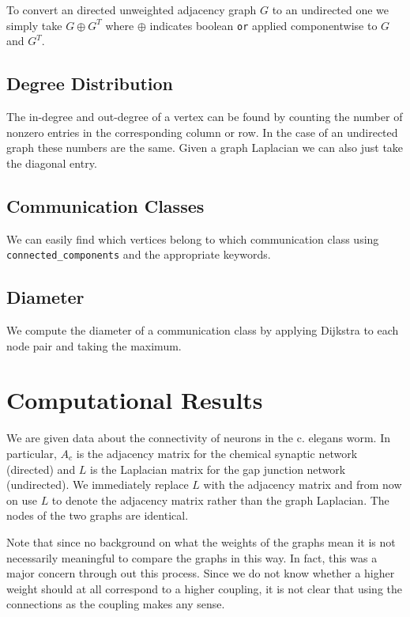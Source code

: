 \documentclass[10pt]{article}
\begin{document}
To convert an directed unweighted adjacency graph \( G \) to an undirected one we simply take \( G \oplus G^T \) where \( \oplus \) indicates boolean {\tt or} applied componentwise to \( G \) and \( G^T \).

\subsection{Degree Distribution}
The in-degree and out-degree of a vertex can be found by counting the number of nonzero entries in the corresponding column or row. In the case of an undirected graph these numbers are the same. Given a graph Laplacian we can also just take the diagonal entry.

\subsection{Communication Classes}
We can easily find which vertices belong to which communication class using {\tt connected\_components} and the appropriate keywords.

\subsection{Diameter}
We compute the diameter of a communication class by applying Dijkstra to each node pair and taking the maximum.


\section{Computational Results}

We are given data about the connectivity of neurons in the c. elegans worm. In particular, \( A_c \) is the adjacency matrix for the chemical synaptic network (directed) and \( L \) is the Laplacian matrix for the gap junction network (undirected). We immediately replace \( L \) with the adjacency matrix and from now on use \( L \) to denote the adjacency matrix rather than the graph Laplacian. The nodes of the two graphs are identical.

Note that since no background on what the weights of the graphs mean it is not necessarily meaningful to compare the graphs in this way. In fact, this was a major concern through out this process. Since we do not know whether a higher weight should at all correspond to a higher coupling, it is not clear that using the connections as the coupling makes any sense.
\end{document}
